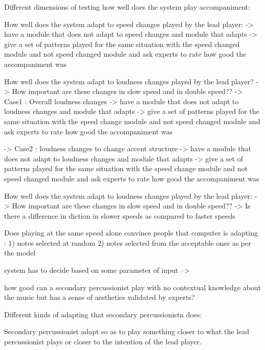 
Different dimensions of testing how well does the system play accompaniment:

\item How well does the system adapt to speed changes played by the lead player:
  -> have a module that does not adapt to speed changes and module that adapts
  -> give a set of patterns played for the same situation with the speed changed module and not speed changed module and ask experts to rate how good the accompaniment was

\item How well does the system adapt to loudness changes played by the lead player? 
  -> How important are these changes in slow speed and in double speed??
  -> Case1 : Overall loudness changes
      -> have a module that does not adapt to loudness changes and module that adapts
      -> give a set of patterns played for the same situation with the speed change module and not speed changed module and ask experts to rate how good the accompaniment was

  -> Case2 : loudness changes to change accent structure
       -> have a module that does not adapt to loudness changes and module that adapts
       -> give a set of patterns played for the same situation with the speed change module and not speed changed module and ask experts to rate how good the accompaniment was

\item How well does the system adapt to loudness changes played by the lead player:
    -> How important are these changes in slow speed and in double speed??
    -> Is there a difference in diction in slower speeds as compared to faster speeds

\item Does playing at the same speed alone convince people that computer is adapting : 1) notes selected at random 2) notes selected from the acceptable ones as per the model

system has to decide based on some parameter of input -->



how good can a secondary percussionist play with no contextual knowledge about the music but has a sense of aesthetics validated by experts?

Different kinds of adapting that secondary percussionistn does:

Secondary percussionist adapt so as to play something closer to what the lead percussionist plays or closer to the intention of the lead player. 

